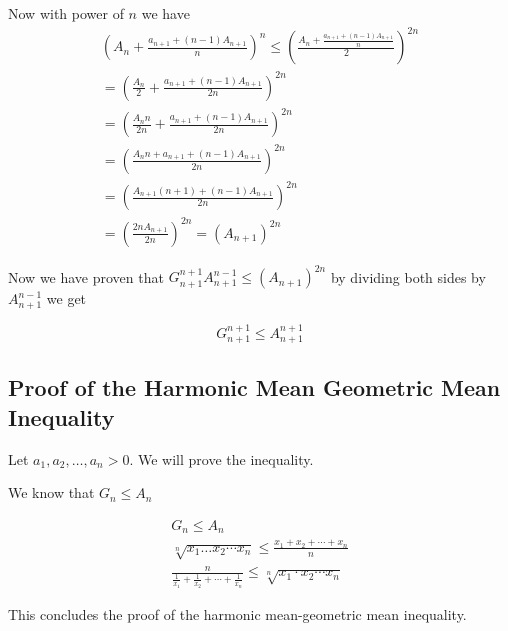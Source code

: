 Now with power of \(n\) we have
\begin{align*}
		{\left( A_{n} + \frac{a_{n + 1} + (n - 1)A_{n + 1}}{n} \right)}^{n} \leq {\left( \frac{A_{n} + \frac{a_{n + 1} + (n - 1)A_{n + 1}}{n}}{2} \right)}^{2n}\\
		= {\left( \frac{A_n}{2} + \frac{a_{n + 1} + (n - 1)A_{n + 1}}{2n}\right)}^{2n}\\
		= {\left( \frac{A_n n}{2n} + \frac{a_{n + 1} + (n - 1)A_{n + 1}}{2n}\right)}^{2n}\\
		= {\left( \frac{A_n n  + a_{n + 1} + (n - 1)A_{n + 1}}{2n}\right)}^{2n}\\
		= {\left( \frac{A_{n + 1}(n + 1) + (n - 1)A_{n + 1}}{2n}\right)}^{2n}\\
		= {\left( \frac{2n A_{n + 1}}{2n}\right)}^{2n} = {\left(A_{n + 1}\right)}^{2n}
\end{align*}

Now we have proven that \(G_{n + 1}^{n + 1} A_{n + 1}^{n - 1}\leq {\left(A_{n + 1}\right)}^{2n}\) 
by dividing both sides by \( A_{n + 1}^{n - 1} \) we get

\[
	G_{n + 1}^{n + 1}\leq A_{n + 1}^{n + 1}
\]

\QED

\subsection{Proof of the Harmonic Mean Geometric Mean Inequality}

Let \( a_1, a_2, \dots, a_n > 0 \). We will prove the inequality.
\vspace{\baselineskip}

We know that \(G_n \leq A_n \)

\begin{align*}
		G_n \leq A_n\\
		\sqrt[n]{x_1 \dots x_2 \cdots x_n} \leq \frac{x_1 + x_2 + \cdots + x_n}{n}\\
		\frac{n}{\frac{1}{x_1} + \frac{1}{x_2} + \cdots + \frac{1}{x_n}} \leq \sqrt[n]{x_1 \cdot x_2 \cdots x_n}
\end{align*}

This concludes the proof of the harmonic mean-geometric mean inequality.

\QED